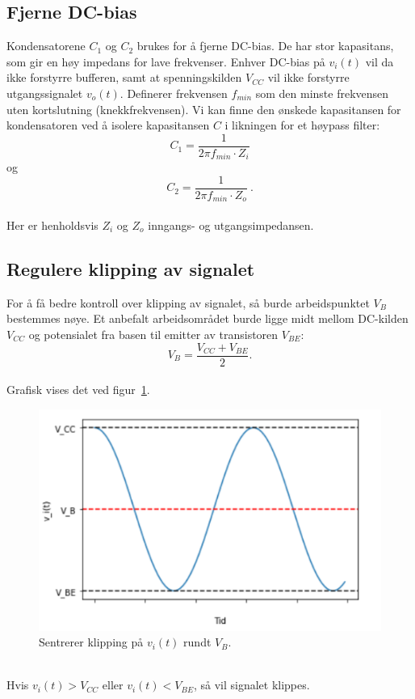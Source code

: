 \documentclass[a4paper,11pt,norsk]{article}
\begin{document}
\subsection{Fjerne DC-bias} \label{subsec: DC-bias}
Kondensatorene $C_1$ og $C_2$ brukes for å fjerne DC-bias.
De har stor kapasitans, som gir en høy impedans for lave frekvenser. Enhver DC-bias på $v_i(t)$ vil da ikke forstyrre bufferen, samt at spenningskilden $V_{CC}$ vil ikke forstyrre utgangssignalet $v_o(t)$. Definerer frekvensen $f_{min}$ som den minste frekvensen uten kortslutning (knekkfrekvensen). Vi kan finne den ønskede kapasitansen for kondensatoren ved å isolere kapasitansen $C$ i likningen for et høypass filter:
\begin{equation} \label{eq: C_1}
    C_1 = \frac{1}{2\pi f_{min} \cdot Z_i}
\end{equation}
og
\begin{equation} \label{eq: C_2}
    C_2 = \frac{1}{2\pi f_{min} \cdot Z_o} \: .
\end{equation}
\\
Her er henholdsvis $Z_i$ og $Z_o$ inngangs- og utgangsimpedansen. 
\newpage
\subsection{Regulere klipping av signalet}
\label{subsec: klipping}
For å få bedre kontroll over klipping av signalet, så burde arbeidspunktet $V_B$ bestemmes nøye. Et anbefalt arbeidsområdet burde ligge midt mellom DC-kilden $V_{CC}$ og potensialet fra basen til emitter av transistoren $V_{BE}$: \\
\begin{equation} \label{eq: V_B}
    V_B = \frac{V_{CC} + V_{BE}}{2}.
\end{equation} \\
Grafisk vises det ved figur~\ref{fig: V_B}.
\begin{figure}[htbp]
    \centering
    \includegraphics[width=1.0\textwidth]{img/Arbeidspunktet.png}
    \caption{Sentrerer klipping på $v_i(t)$ rundt $V_B$.}
    \label{fig: V_B}
\end{figure} \\
Hvis $v_i(t) > V_{CC}$ eller $v_i(t) < V_{BE}$, så vil signalet klippes.
\newpage
\end{document}
